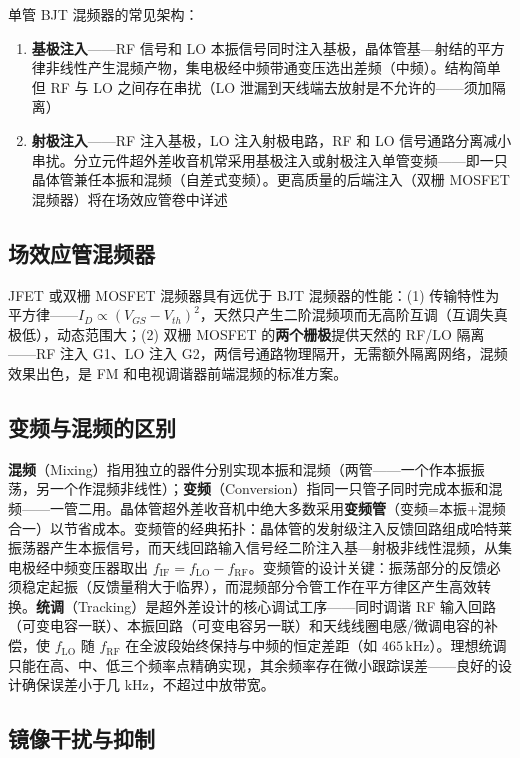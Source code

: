 \documentclass[12pt,UTF8]{ctexbook}
\begin{document}
单管 BJT 混频器的常见架构：
\begin{enumerate}
\item \textbf{基极注入}——RF 信号和 LO 本振信号同时注入基极，晶体管基—射结的平方律非线性产生混频产物，集电极经中频带通变压选出差频（中频）。结构简单但 RF 与 LO 之间存在串扰（LO 泄漏到天线端去放射是不允许的——须加隔离）
\item \textbf{射极注入}——RF 注入基极，LO 注入射极电路，RF 和 LO 信号通路分离减小串扰。分立元件超外差收音机常采用基极注入或射极注入单管变频——即一只晶体管兼任本振和混频（自差式变频）。更高质量的后端注入（双栅 MOSFET 混频器）将在场效应管卷中详述
\end{enumerate}

\subsection{场效应管混频器}

JFET 或双栅 MOSFET 混频器具有远优于 BJT 混频器的性能：(1) 传输特性为平方律——$I_D \propto (V_{GS}-V_{th})^2$，天然只产生二阶混频项而无高阶互调（互调失真极低），动态范围大；(2) 双栅 MOSFET 的\textbf{两个栅极}提供天然的 RF/LO 隔离——RF 注入 G1、LO 注入 G2，两信号通路物理隔开，无需额外隔离网络，混频效果出色，是 FM 和电视调谐器前端混频的标准方案。

\subsection{变频与混频的区别}

\textbf{混频}（Mixing）指用独立的器件分别实现本振和混频（两管——一个作本振振荡，另一个作混频非线性）；\textbf{变频}（Conversion）指同一只管子同时完成本振和混频——一管二用。晶体管超外差收音机中绝大多数采用\textbf{变频管}（变频=本振+混频合一）以节省成本。变频管的经典拓扑：晶体管的发射级注入反馈回路组成哈特莱振荡器产生本振信号，而天线回路输入信号经二阶注入基—射极非线性混频，从集电极经中频变压器取出 $f_{\text{IF}} = f_{\text{LO}} - f_{\text{RF}}$。变频管的设计关键：振荡部分的反馈必须稳定起振（反馈量稍大于临界），而混频部分令管工作在平方律区产生高效转换。\textbf{统调}（Tracking）是超外差设计的核心调试工序——同时调谐 RF 输入回路（可变电容一联）、本振回路（可变电容另一联）和天线线圈电感/微调电容的补偿，使 $f_{\text{LO}}$ 随 $f_{\text{RF}}$ 在全波段始终保持与中频的恒定差距（如 $465\,\mathrm{kHz}$）。理想统调只能在高、中、低三个频率点精确实现，其余频率存在微小跟踪误差——良好的设计确保误差小于几 kHz，不超过中放带宽。

\subsection{镜像干扰与抑制}
\end{document}
